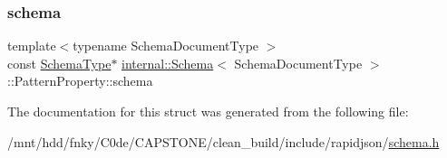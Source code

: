 \subsubsection{\texorpdfstring{schema}{schema}}
{\footnotesize\ttfamily template$<$typename Schema\+Document\+Type $>$ \\
const \hyperlink{classinternal_1_1Schema_ac2556ebf7a7db971e1c1c0f76eb5786e}{Schema\+Type}$\ast$ \hyperlink{classinternal_1_1Schema}{internal\+::\+Schema}$<$ Schema\+Document\+Type $>$\+::Pattern\+Property\+::schema}



The documentation for this struct was generated from the following file\+:\begin{DoxyCompactItemize}
\item 
/mnt/hdd/fnky/\+C0de/\+C\+A\+P\+S\+T\+O\+N\+E/clean\+\_\+build/include/rapidjson/\hyperlink{schema_8h}{schema.\+h}\end{DoxyCompactItemize}
